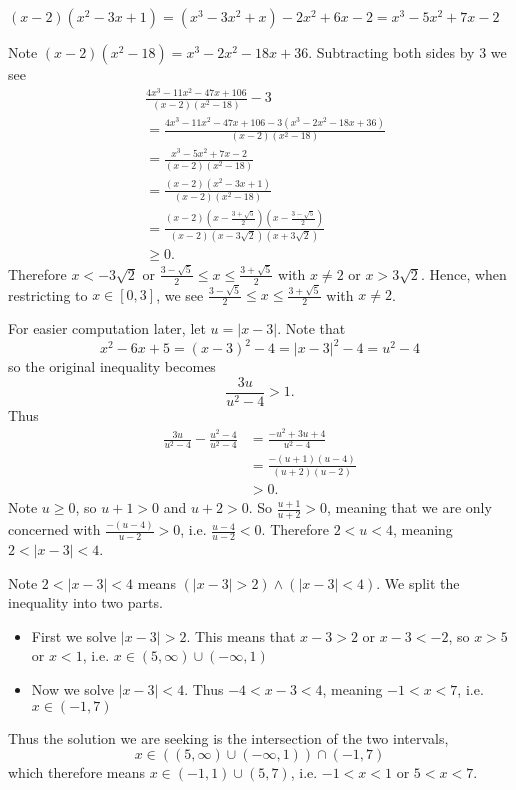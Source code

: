 \begin{questions}
    \item \begin{partquestions}{\roman*}
        \item $(x-2)(x^2-3x+1) = (x^3 - 3x^2 + x) - 2x^2 + 6x - 2 = x^3 - 5x^2 + 7x - 2$
        \item Note $(x-2)(x^2-18) = x^3 - 2x^2 - 18x + 36$. Subtracting both sides by 3 we see
        \begin{align*}
            &\frac{4x^3 - 11x^2 - 47x + 106}{(x-2)(x^2-18)} - 3\\
            &= \frac{4x^3 - 11x^2 - 47x + 106 - 3(x^3 - 2x^2 - 18x + 36)}{(x-2)(x^2-18)}\\
            &= \frac{x^3 - 5x^2 + 7x - 2}{(x-2)(x^2-18)}\\
            &= \frac{(x-2)(x^2-3x+1)}{(x-2)(x^2-18)}\\
            &= \frac{(x-2)\left(x - \frac{3+\sqrt5}{2}\right)\left(x - \frac{3-\sqrt5}{2}\right)}{(x-2)(x-3\sqrt2)(x+3\sqrt2)}\\
            &\geq 0.
        \end{align*}
        Therefore $x < -3\sqrt2$ or $\frac{3-\sqrt5}{2} \leq x \leq \frac{3+\sqrt5}{2}$ with $x \neq 2$ or $x > 3\sqrt2$. Hence, when restricting to $x \in [0, 3]$, we see $\frac{3-\sqrt5}{2} \leq x \leq \frac{3+\sqrt5}{2}$ with $x \neq 2$.
    \end{partquestions}

    \item For easier computation later, let $u = |x-3|$. Note that
    \[
        x^2 - 6x + 5 = (x-3)^2 - 4 = |x-3|^2 - 4 = u^2 - 4
    \]
    so the original inequality becomes
    \[
        \frac{3u}{u^2 - 4} > 1.
    \]
    Thus
    \begin{align*}
        \frac{3u}{u^2-4} - \frac{u^2 - 4}{u^2 - 4} &= \frac{-u^2 + 3u + 4}{u^2-4}\\
        &= \frac{-(u+1)(u-4)}{(u+2)(u-2)}\\
        &> 0.
    \end{align*}
    Note $u \geq 0$, so $u+1 > 0$ and $u+2 > 0$. So $\frac{u+1}{u+2} > 0$, meaning that we are only concerned with $\frac{-(u-4)}{u-2} > 0$, i.e. $\frac{u-4}{u-2} < 0$. Therefore $2 < u < 4$, meaning $2 < |x - 3| < 4$.

    Note $2 < |x - 3| < 4$ means $(|x-3| > 2) \land (|x-3| < 4)$. We split the inequality into two parts.
    \begin{itemize}
        \item First we solve $|x-3| > 2$. This means that $x - 3 > 2$ or $x - 3 < -2$, so $x > 5$ or $x < 1$, i.e. $x \in (5, \infty) \cup (-\infty, 1)$
        \item Now we solve $|x - 3| < 4$. Thus $-4 < x-3 < 4$, meaning $-1 < x < 7$, i.e. $x \in (-1, 7)$
    \end{itemize}
    Thus the solution we are seeking is the intersection of the two intervals,
    \[
        x \in ((5, \infty) \cup (-\infty, 1)) \cap (-1, 7)
    \]
    which therefore means $x \in (-1, 1) \cup (5, 7)$, i.e. $-1 < x < 1$ or $5 < x < 7$.


\end{questions}
